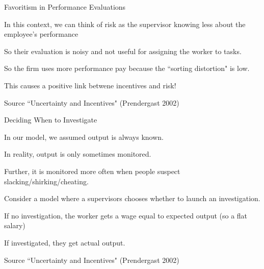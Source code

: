 \documentclass[aspectratio=169,usenames,dvipsnames]{beamer}
\newenvironment{wideitemize}{\itemize\addtolength{\itemsep}{10pt}}{\enditemize}
\begin{document}
\begin{frame}{Favoritism in Performance Evaluations}

\begin{wideitemize}
     \item In this context, we can think of risk as the supervisor knowing less about the employee's performance
     \item So their evaluation is noisy and not useful for assigning the worker to tasks.
     \item So the firm uses more performance pay because the ``sorting distortion" is low.
     \item This causes a positive link betwene incentives and risk!
\end{wideitemize}



\small Source ``Uncertainty and Incentives" (Prendergast 2002)

    
\end{frame}



\begin{frame}{Deciding When to Investigate}

\begin{wideitemize}
     \item In our model, we assumed output is always known.
     \item In reality, output is only sometimes monitored.
     \item Further, it is monitored more often when people suspect slacking/shirking/cheating.
     \item Consider a model where a supervisors chooses whether to launch an investigation.
     \item If no investigation, the worker gets a wage equal to expected output (so a flat salary)
     \item If investigated, they get actual output.
\end{wideitemize}



\small Source ``Uncertainty and Incentives" (Prendergast 2002)

    
\end{frame}
\end{document}
